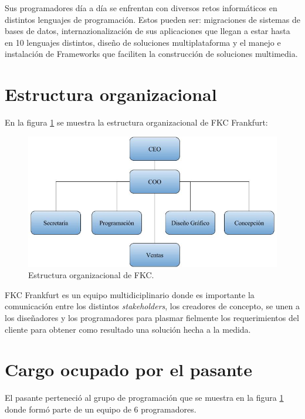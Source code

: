 Sus programadores día a día se enfrentan con diversos retos informáticos en distintos lenguajes de programación. Estos pueden ser: migraciones de sistemas de bases de datos, internazionalización de sus aplicaciones que llegan a estar hasta en 10 lenguajes distintos, diseño de soluciones multiplataforma y el manejo e instalación de Frameworks que faciliten la construcción de soluciones multimedia.

\section{Estructura organizacional}

En la figura \ref{fig:estructuraFKC} se muestra la estructura organizacional de FKC Frankfurt:

\begin{figure}[h]
\begin{center}
	\includegraphics[width=\textwidth]{figuras/estructuraFKC.jpg}
	\caption{Estructura organizacional de FKC.} \label{fig:estructuraFKC}
\end{center}
\end{figure}

FKC Frankfurt es un equipo multidiciplinario donde es importante la comunicación entre los distintos \emph{stakeholders}, los creadores de concepto, se unen a los diseñadores y los programadores para plasmar fielmente los requerimientos del cliente para obtener como resultado una solución hecha a la medida.

\section{Cargo ocupado por el pasante} 

El pasante perteneció al grupo de programación que se muestra en la figura \ref{fig:estructuraFKC} donde formó parte de un equipo de 6 programadores.



